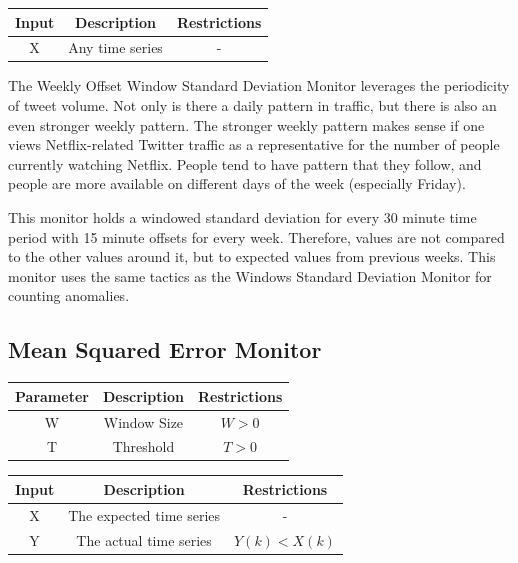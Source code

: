 \documentclass[12pt]{ucthesis}
\begin{document}
\begin{table}[H]
   \begin{center}
      \begin{tabular}{|c|c|c|}
         \hline
            Input & Description & Restrictions \\
         \hline
            X & Any time series & - \\
         \hline
      \end{tabular}
   \end{center}
\end{table}

The Weekly Offset Window Standard Deviation Monitor leverages the periodicity of tweet volume.
Not only is there a daily pattern in traffic, but there is also an even stronger weekly pattern.
The stronger weekly pattern makes sense if one views Netflix-related Twitter traffic as a representative for the number of
people currently watching Netflix. People tend to have pattern that they follow, and people are more available
on different days of the week (especially Friday).

This monitor holds a windowed standard deviation for every 30 minute time period with 15 minute offsets
for every week. Therefore, values are not compared to the other values around it, but to expected values from
previous weeks. This monitor uses the same tactics as the Windows Standard Deviation Monitor for counting anomalies.

\subsection{Mean Squared Error Monitor}
\label{outage-detection-monitors-MSE}
\begin{table}[H]
   \begin{center}
      \begin{tabular}{|c|c|c|}
         \hline
            Parameter & Description & Restrictions \\
         \hline
            W & Window Size & $ W > 0 $\\
         \hline
            T & Threshold & $ T > 0 $\\
         \hline
      \end{tabular}
   \end{center}
\end{table}

\begin{table}[H]
   \begin{center}
      \begin{tabular}{|c|c|c|}
         \hline
            Input & Description & Restrictions \\
         \hline
            X & The expected time series & - \\
         \hline
            Y & The actual time series & $ Y(k) < X(k) $ \\
         \hline
      \end{tabular}
   \end{center}
\end{table}
\end{document}
